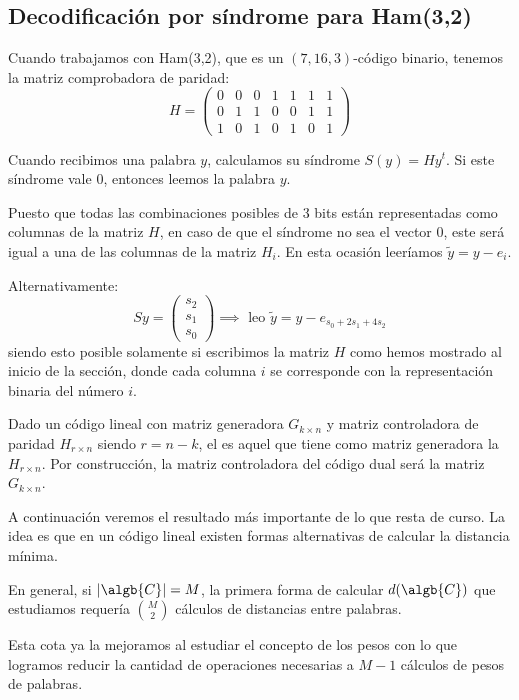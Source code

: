 \subsection{Decodificación por síndrome para Ham(3,2)}
Cuando trabajamos con Ham(3,2), que es un $(7,16,3)$-código binario, tenemos la matriz comprobadora de paridad:
\[H = \left(\begin{array}{ccccccc}
0 & 0 & 0 & 1 & 1 & 1 & 1 \\
0 & 1 & 1 & 0 & 0 & 1 & 1\\
1 & 0 & 1 & 0 & 1 & 0 & 1
\end{array}\right) \]

Cuando recibimos una palabra $y$, calculamos su síndrome $S(y)=Hy^t$. Si este síndrome vale 0, entonces leemos la palabra $y$.

Puesto que todas las combinaciones posibles de 3 bits están representadas como columnas de la matriz $H$, en caso de que el síndrome no sea el vector 0, este será igual a una de las columnas de la matriz $H_i$. En esta ocasión leeríamos $\tilde{y}=y-e_i$.

Alternativamente:
\[Sy=\left( \begin{array}{c} s_2 \\ s_1 \\ s_0 \end{array}\right) \implies \text{ leo } \tilde{y} = y-e_{s_0+2s_1+4s_2}\]
siendo esto posible solamente si escribimos la matriz $H$ como hemos mostrado al inicio de la sección, donde cada columna $i$ se corresponde con la representación binaria del número $i$.

Dado un código lineal con matriz generadora $G_{k \times n}$ y matriz controladora de paridad $H_{r\times n}$ siendo $r=n-k$, el  es aquel que tiene como matriz generadora la $H_{r\times n}$. Por construcción, la matriz controladora del código dual será la matriz $G_{k\times n}$.

A continuación veremos el resultado más importante de lo que resta de curso. La idea es que en un código lineal existen formas alternativas de calcular la distancia mínima.

En general, si $|\algb{C}|=M$, la primera forma de calcular $d(\algb{C})$ que estudiamos requería ${M \choose 2}$ cálculos de distancias entre palabras.

Esta cota ya la mejoramos al estudiar el concepto de los pesos con lo que logramos reducir la cantidad de operaciones necesarias a $M-1$ cálculos de pesos de palabras.

